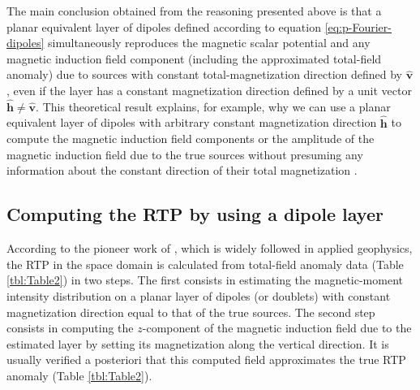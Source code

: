 \documentclass[manuscript,noblind]{geophysics}
\begin{document}
	The main conclusion obtained from the reasoning presented above is that a planar equivalent layer of dipoles defined according 
	to equation \ref{eq:p-Fourier-dipoles} simultaneously 
	reproduces the magnetic scalar potential and any magnetic induction field component (including the approximated total-field anomaly) 
	due to sources with constant total-magnetization direction defined by $\hat{\mathbf{v}}$, even if the layer has a constant magnetization 
	direction defined by a unit vector $\hat{\mathbf{h}} \ne \hat{\mathbf{v}}$. 
	This theoretical result explains, for example, why we can use a planar equivalent layer of dipoles with arbitrary constant 
	magnetization direction $\hat{\mathbf{h}}$ to compute the magnetic induction field components or the amplitude of the magnetic induction field due to the true sources 
	without presuming any information about the constant direction of their total magnetization 
	\citep[e.g,][]{li_etal_2021}.
	
	
	\subsection{Computing the RTP by using a dipole layer}
	
	
	According to the pioneer work of \citet{silva1986}, which is widely followed in applied geophysics, 
	the RTP in the space domain is calculated from total-field anomaly data (Table \ref{tbl:Table2}) in two steps.
	The first consists in estimating the magnetic-moment intensity distribution on a planar layer 
	of dipoles (or doublets) with constant magnetization direction equal to that of the true sources.
	The second step consists in computing the $z$-component of the magnetic induction field due 
	to the estimated layer by setting its magnetization along the vertical direction.
	It is usually verified a posteriori that this computed field approximates the true RTP anomaly (Table \ref{tbl:Table2}).
	
\end{document}
